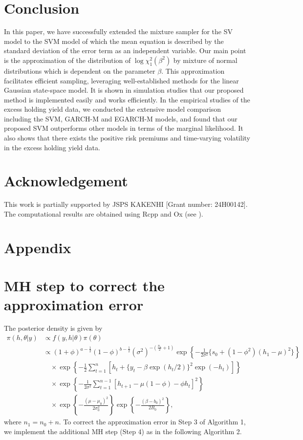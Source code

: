 \section{Conclusion}
In this paper, we have successfully extended the mixture sampler for the SV model to the SVM model of which the mean equation is described by the standard deviation of the error term as an independent variable.
Our main point is the approximation of the distribution of $\log \chi_1^2(\beta^2)$ by mixture of normal distributions which is dependent on the parameter $\beta$. This approximation facilitates efficient sampling, leveraging well-established methods for the linear Gaussian state-space model. It is shown in simulation studies that our proposed method is implemented easily and works efficiently.
In the empirical studies of the excess holding yield data, we conducted the extensive model comparison including the SVM, GARCH-M and EGARCH-M models, and found that our proposed SVM outperforms other models in terms of the marginal likelihood. 
It also shows that there exists the positive risk premiums and time-varying volatility in the excess holding yield data.
\section*{Acknowledgement}
This work is partially supported by  JSPS KAKENHI [Grant number: 24H00142]. The
computational results are obtained using Rcpp and Ox (see \cite{Doornik(07)}).
\small
	
\normalsize
\appendix
\section*{Appendix}
\section{MH step to correct the approximation error}
\label{appendix:correction}
\noindent

The posterior density is given by
\begin{align*}
    \pi(h, \theta|y) &\propto f(y, h|\theta) \pi(\theta) \\
    &\propto (1+\phi)^{a-\frac{1}{2}} (1-\phi)^{b-\frac{1}{2}}  (\sigma^2)^{-\left( \frac{n_1}{2}+1 \right)} \exp \left\{ -\frac{1}{2\sigma^2} \{ s_0 + (1-\phi^2)(h_1-\mu)^2 \} \right\} \\
    &\quad \times \exp \left\{ -\frac{1}{2} \sum_{t=1}^n [ h_t + \{ y_t -\beta\exp(h_t/2) \}^2 \exp(-h_t) ] \right\} \\
    &\quad \times \exp \left\{ -\frac{1}{2\sigma^2} \sum_{t=1}^{n-1} [ h_{t+1} - \mu(1-\phi) -\phi h_t ]^2 \right\} \\
    &\quad \times \exp \left\{ -\frac{(\mu-\mu_0)^2}{2\sigma_0^2} \right\} \exp \left\{ -\frac{(\beta-b_0)^2}{2B_0} \right\},
\end{align*}
where $n_1 = n_0 + n$.
To correct the approximation error in Step 3 of Algorithm 1, we implement the additional MH step (Step 4) as in the following Algorithm 2. \\ 
\bigskip

